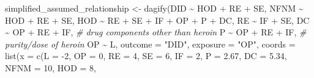 \documentclass[
]{article}
\newenvironment{Shaded}{\begin{snugshade}}{\end{snugshade}}
\newcommand{\AttributeTok}[1]{\textcolor[rgb]{0.77,0.63,0.00}{#1}}
\newcommand{\CommentTok}[1]{\textcolor[rgb]{0.56,0.35,0.01}{\textit{#1}}}
\newcommand{\DecValTok}[1]{\textcolor[rgb]{0.00,0.00,0.81}{#1}}
\newcommand{\FloatTok}[1]{\textcolor[rgb]{0.00,0.00,0.81}{#1}}
\newcommand{\FunctionTok}[1]{\textcolor[rgb]{0.00,0.00,0.00}{#1}}
\newcommand{\NormalTok}[1]{#1}
\newcommand{\OtherTok}[1]{\textcolor[rgb]{0.56,0.35,0.01}{#1}}
\newcommand{\SpecialCharTok}[1]{\textcolor[rgb]{0.00,0.00,0.00}{#1}}
\newcommand{\StringTok}[1]{\textcolor[rgb]{0.31,0.60,0.02}{#1}}
\begin{document}
\begin{Shaded}
\begin{Highlighting}[]
\NormalTok{simplified\_assumed\_relationship }\OtherTok{\textless{}{-}} \FunctionTok{dagify}\NormalTok{(DID }\SpecialCharTok{\textasciitilde{}}\NormalTok{ HOD }\SpecialCharTok{+}\NormalTok{ RE }\SpecialCharTok{+}\NormalTok{ SE,}
\NormalTok{                                          NFNM }\SpecialCharTok{\textasciitilde{}}\NormalTok{ HOD }\SpecialCharTok{+}\NormalTok{ RE }\SpecialCharTok{+}\NormalTok{ SE,}
\NormalTok{                                          HOD }\SpecialCharTok{\textasciitilde{}}\NormalTok{ RE }\SpecialCharTok{+}\NormalTok{ SE }\SpecialCharTok{+}\NormalTok{ IF }\SpecialCharTok{+}\NormalTok{ OP }\SpecialCharTok{+}\NormalTok{ P }\SpecialCharTok{+}\NormalTok{ DC,}
\NormalTok{                                          RE }\SpecialCharTok{\textasciitilde{}}\NormalTok{ IF }\SpecialCharTok{+}\NormalTok{ SE,}
\NormalTok{                                          DC }\SpecialCharTok{\textasciitilde{}}\NormalTok{ OP }\SpecialCharTok{+}\NormalTok{ RE }\SpecialCharTok{+}\NormalTok{ IF, }\CommentTok{\# drug components other than heroin}
\NormalTok{                                          P }\SpecialCharTok{\textasciitilde{}}\NormalTok{ OP }\SpecialCharTok{+}\NormalTok{ RE }\SpecialCharTok{+}\NormalTok{ IF, }\CommentTok{\# purity/dose of heroin}
\NormalTok{                                          OP }\SpecialCharTok{\textasciitilde{}}\NormalTok{ L,}
                                          \AttributeTok{outcome =} \StringTok{"DID"}\NormalTok{,}
                                          \AttributeTok{exposure =} \StringTok{"OP"}\NormalTok{,}
                                          \AttributeTok{coords =} \FunctionTok{list}\NormalTok{(}\AttributeTok{x =} \FunctionTok{c}\NormalTok{(}\AttributeTok{L =} \SpecialCharTok{{-}}\DecValTok{2}\NormalTok{,}
                                                              \AttributeTok{OP =} \DecValTok{0}\NormalTok{,}
                                                              \AttributeTok{RE =} \DecValTok{4}\NormalTok{, }\AttributeTok{SE =} \DecValTok{6}\NormalTok{, }\AttributeTok{IF =} \DecValTok{2}\NormalTok{,}
                                                              \AttributeTok{P =} \FloatTok{2.67}\NormalTok{,}
                                                              \AttributeTok{DC =} \FloatTok{5.34}\NormalTok{,}
                                                              \AttributeTok{NFNM =} \DecValTok{10}\NormalTok{,}
                                                              \AttributeTok{HOD =} \DecValTok{8}\NormalTok{,}

\end{Highlighting}
\end{Shaded}
\end{document}
